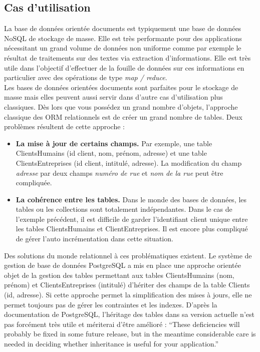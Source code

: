 \subsection{Cas d'utilisation}

  La base de données orientée documents est typiquement une base de données NoSQL de stockage de masse. Elle est très performante pour des applications nécessitant un grand volume de données non uniforme comme par exemple le résultat de traitements sur des textes via extraction d'informations. Elle est très utile dans l'objectif d'effectuer de la fouille de données sur ces informations en particulier avec des opérations de type \textit{map / reduce}.\\

  Les bases de données orientées documents sont parfaites pour le stockage de masse mais elles peuvent aussi servir dans d'autre cas d'utilisation plus classiques. Dès lors que vous possédez un grand nombre d'objets, l'approche classique des ORM relationnels est de créer un grand nombre de tables. Deux problèmes résultent de cette approche : \\
  \begin{itemize}
    \item \textbf{La mise à jour de certains champs.} Par exemple, une table ClientsHumains (id client, nom, prénom, adresse) et une table ClientsEntreprises (id client, intitulé, adresse). La modification du champ \textit{adresse} par deux champs \textit{numéro de rue} et \textit{nom de la rue} peut être compliquée.
    \item \textbf{La cohérence entre les tables.} Dans le monde des bases de données, les tables ou les collections sont totalement indépendantes. Dans le cas de l'exemple précédent, il est difficile de garder l'identifiant client unique entre les tables ClientsHumains et ClientEntreprises. Il est encore plus compliqué de gérer l'auto incrémentation dans cette situation.
  \end{itemize}

  \vspace{10px}

  Des solutions du monde relationnel à ces problématiques existent. Le système de gestion de base de données PostgreSQL a mis en place une approche orientée objet de la gestion des tables permettant aux tables ClientsHumains (nom, prénom) et ClientsEntreprises (intitulé) d'hériter des champs de la table Clients (id, adresse). Si cette approche permet la simplification des mises à jours, elle ne permet toujours pas de gérer les contraintes et les indexes. D'après la documentation de PostgreSQL, l'héritage des tables dans sa version actuelle n'est pas forcément très utile et mériterai d'être amélioré :
  \enquote{These deficiencies will probably be fixed in some future release, but in the meantime considerable care is needed in deciding whether inheritance is useful for your application.}\cite{Postgre_inheritance}\\

